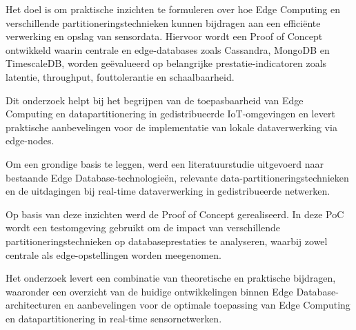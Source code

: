 Het doel is om praktische inzichten te formuleren over hoe Edge Computing en verschillende partitioneringstechnieken kunnen bijdragen aan een efficiënte verwerking en opslag van sensordata. Hiervoor wordt een Proof of Concept ontwikkeld waarin centrale en edge-databases zoals Cassandra, MongoDB en TimescaleDB, worden geëvalueerd op belangrijke prestatie-indicatoren zoals latentie, throughput, fouttolerantie en schaalbaarheid.

Dit onderzoek helpt bij het begrijpen van de toepasbaarheid van Edge Computing en datapartitionering in gedistribueerde IoT-omgevingen en levert praktische aanbevelingen voor de implementatie van lokale dataverwerking via edge-nodes.

Om een grondige basis te leggen, werd een literatuurstudie uitgevoerd naar bestaande Edge Database-technologieën, relevante data-partitioneringstechnieken en de uitdagingen bij real-time dataverwerking in gedistribueerde netwerken.

Op basis van deze inzichten werd de Proof of Concept gerealiseerd. In deze PoC wordt een testomgeving gebruikt om de impact van verschillende partitioneringstechnieken op databaseprestaties te analyseren, waarbij zowel centrale als edge-opstellingen worden meegenomen.

Het onderzoek levert een combinatie van theoretische en praktische bijdragen, waaronder een overzicht van de huidige ontwikkelingen binnen Edge Database-architecturen en aanbevelingen voor de optimale toepassing van Edge Computing en datapartitionering in real-time sensornetwerken.
